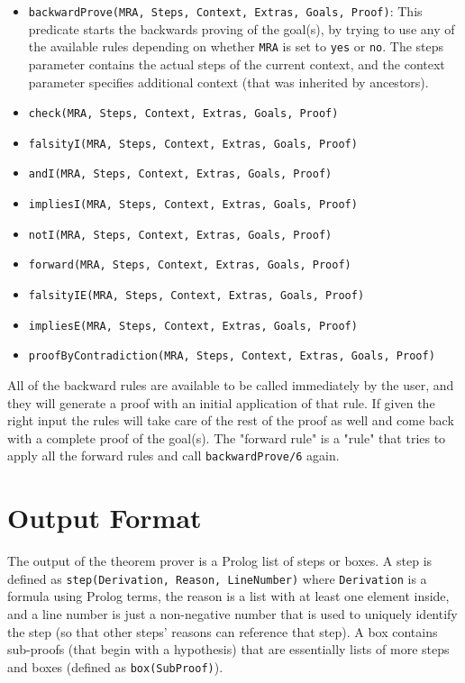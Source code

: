 \documentclass[11pt,twoside,a4paper]{report}
\begin{document}
\begin{itemize}
\item
\lstinline$backwardProve(MRA, Steps, Context, Extras, Goals, Proof)$: This predicate starts the backwards proving of the goal(s), by trying to use any of the available rules depending on whether \lstinline$MRA$ is set to \lstinline$yes$ or \lstinline$no$. The steps parameter contains the actual steps of the current context, and the context parameter specifies additional context (that was inherited by ancestors).
\item
\lstinline$check(MRA, Steps, Context, Extras, Goals, Proof)$
\item
\lstinline$falsityI(MRA, Steps, Context, Extras, Goals, Proof)$
\item
\lstinline$andI(MRA, Steps, Context, Extras, Goals, Proof)$
\item
\lstinline$impliesI(MRA, Steps, Context, Extras, Goals, Proof)$
\item
\lstinline$notI(MRA, Steps, Context, Extras, Goals, Proof)$
\item
\lstinline$forward(MRA, Steps, Context, Extras, Goals, Proof)$
\item
\lstinline$falsityIE(MRA, Steps, Context, Extras, Goals, Proof)$
\item
\lstinline$impliesE(MRA, Steps, Context, Extras, Goals, Proof)$
\item
\lstinline$proofByContradiction(MRA, Steps, Context, Extras, Goals, Proof)$
\end{itemize}

All of the backward rules are available to be called immediately by the user, and they will generate a proof with an initial application of that rule. If given the right input the rules will take care of the rest of the proof as well and come back with a complete proof of the goal(s). The "forward rule" is a "rule" that tries to apply all the forward rules and call \lstinline$backwardProve/6$ again.

\section{Output Format}
\label{sec:outputformat}
The output of the theorem prover is a Prolog list of steps or boxes. A step is defined as \lstinline$step(Derivation, Reason, LineNumber)$ where \lstinline$Derivation$ is a formula using Prolog terms, the reason is a list with at least one element inside, and a line number is just a non-negative number that is used to uniquely identify the step (so that other steps' reasons can reference that step). A box contains sub-proofs (that begin with a hypothesis) that are essentially lists of more steps and boxes (defined as \lstinline$box(SubProof)$).
\end{document}
